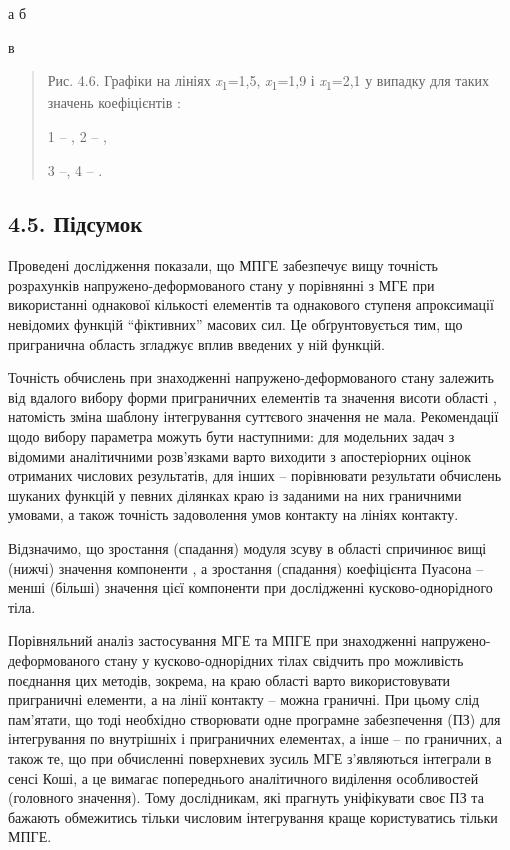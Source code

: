 а б

в

\begin{quote}
Рис. 4.6. Графіки на лініях \emph{x}\textsubscript{1}=1,5,
\emph{x}\textsubscript{1}=1,9 і \emph{x}\textsubscript{1}=2,1 у випадку
для таких значень коефіцієнтів :

1 -- , 2 -- ,

3 --, 4 -- .
\end{quote}

\hypertarget{ux43fux456ux434ux441ux443ux43cux43eux43a-2}{%
\subsection{4.5.
Підсумок}\label{ux43fux456ux434ux441ux443ux43cux43eux43a-2}}

Проведені дослідження показали, що МПГЕ забезпечує вищу точність
розрахунків напружено-деформованого стану у порівнянні з МГЕ при
використанні однакової кількості елементів та однакового ступеня
апроксимації невідомих функцій ``фіктивних'' масових сил. Це
обґрунто­вується тим, що пригранична область згладжує вплив введених у
ній функцій.

Точність обчислень при знаходженні напружено-деформованого стану
залежить від вдалого вибору форми приграничних елементів та значення
висоти області , натомість зміна шаблону інтегрування суттєвого значення
не мала. Рекомендації щодо вибору параметра можуть бути наступними: для
модельних задач з відомими аналітичними розв'язками варто виходити з
апостеріорних оцінок отриманих числових результатів, для інших --
порівнювати результати обчислень шуканих функцій у певних ділянках краю
із заданими на них граничними умовами, а також точність задоволення умов
контакту на лініях контакту.

Відзначимо, що зростання (спадання) модуля зсуву в області спричинює
вищі (нижчі) значення компоненти , а зростання (спадання) коефіцієнта
Пуасона -- менші (більші) значення цієї компоненти при дослідженні
кусково-однорідного тіла.

Порівняльний аналіз застосування МГЕ та МПГЕ при знаходженні
напружено-деформованого стану у кусково-однорідних тілах свідчить про
можливість поєднання цих методів, зокрема, на краю області варто
використовувати приграничні елементи, а на лінії контакту -- можна
граничні. При цьому слід пам'ятати, що тоді необхідно створювати одне
програмне забезпечення (ПЗ) для інтегрування по внутрішніх і
приграничних елементах, а інше -- по граничних, а також те, що при
обчисленні поверхневих зусиль МГЕ з'являються інтеграли в сенсі Коші, а
це вимагає попереднього аналітичного виділення особливостей (головного
значення). Тому дослідникам, які прагнуть уніфікувати своє ПЗ та бажають
обмежитись тільки числовим інтегрування краще користуватись тільки МПГЕ.


